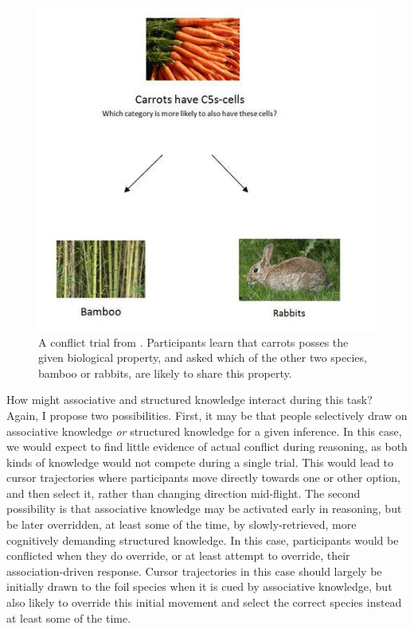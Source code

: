 \begin{figure}[ht]
  \centering
  \includegraphics[width=\figurewidth]{imgs/crisp_screenshot.png}
  \caption[A conflict trial from \citet{Bright}.]{
    A conflict trial from \citet{Bright}.
    Participants learn that carrots posses the given biological property,
    and asked which of the other two species, bamboo or rabbits,
    are likely to share this property.
    \label{fig:crisp_screenshot} }
\end{figure}


How might associative and structured knowledge interact during this task?
Again, I propose two possibilities.
First, it may be that people selectively draw on associative knowledge
\emph{or} structured knowledge for a given inference.
In this case, we would expect to find
little evidence of actual conflict during reasoning,
as both kinds of knowledge would not compete during a single trial.
This would lead to cursor trajectories where
participants move directly towards one or other option, and then select it,
rather than changing direction mid-flight.
The second possibility is that
associative knowledge may be activated early in reasoning,
but be later overridden, at least some of the time,
by slowly-retrieved, more cognitively demanding structured knowledge.
In this case, participants would be conflicted
when they do override, or at least attempt to override,
their association-driven response.
Cursor trajectories in this case should largely be
initially drawn to the foil species
when it is cued by associative knowledge,
but also likely to override this initial movement
and select the correct species instead
at least some of the time.



